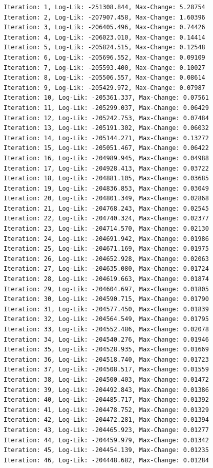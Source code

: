 \documentclass[
  letterpaper,
  DIV=11,
  numbers=noendperiod]{scrreport}
\begin{document}
\begin{verbatim}
Iteration: 1, Log-Lik: -251308.844, Max-Change: 5.28754
Iteration: 2, Log-Lik: -207907.458, Max-Change: 1.60396
Iteration: 3, Log-Lik: -206405.496, Max-Change: 0.74426
Iteration: 4, Log-Lik: -206023.010, Max-Change: 0.14414
Iteration: 5, Log-Lik: -205824.515, Max-Change: 0.12548
Iteration: 6, Log-Lik: -205696.552, Max-Change: 0.09109
Iteration: 7, Log-Lik: -205593.400, Max-Change: 0.10027
Iteration: 8, Log-Lik: -205506.557, Max-Change: 0.08614
Iteration: 9, Log-Lik: -205429.972, Max-Change: 0.07987
Iteration: 10, Log-Lik: -205361.337, Max-Change: 0.07561
Iteration: 11, Log-Lik: -205299.037, Max-Change: 0.06429
Iteration: 12, Log-Lik: -205242.753, Max-Change: 0.07484
Iteration: 13, Log-Lik: -205191.302, Max-Change: 0.06032
Iteration: 14, Log-Lik: -205144.271, Max-Change: 0.13272
Iteration: 15, Log-Lik: -205051.467, Max-Change: 0.06422
Iteration: 16, Log-Lik: -204989.945, Max-Change: 0.04988
Iteration: 17, Log-Lik: -204928.413, Max-Change: 0.03722
Iteration: 18, Log-Lik: -204881.105, Max-Change: 0.03685
Iteration: 19, Log-Lik: -204836.853, Max-Change: 0.03049
Iteration: 20, Log-Lik: -204801.349, Max-Change: 0.02868
Iteration: 21, Log-Lik: -204768.243, Max-Change: 0.02545
Iteration: 22, Log-Lik: -204740.324, Max-Change: 0.02377
Iteration: 23, Log-Lik: -204714.570, Max-Change: 0.02130
Iteration: 24, Log-Lik: -204691.942, Max-Change: 0.01986
Iteration: 25, Log-Lik: -204671.169, Max-Change: 0.01975
Iteration: 26, Log-Lik: -204652.928, Max-Change: 0.02063
Iteration: 27, Log-Lik: -204635.080, Max-Change: 0.01724
Iteration: 28, Log-Lik: -204619.663, Max-Change: 0.01874
Iteration: 29, Log-Lik: -204604.697, Max-Change: 0.01805
Iteration: 30, Log-Lik: -204590.715, Max-Change: 0.01790
Iteration: 31, Log-Lik: -204577.450, Max-Change: 0.01839
Iteration: 32, Log-Lik: -204564.549, Max-Change: 0.01795
Iteration: 33, Log-Lik: -204552.486, Max-Change: 0.02078
Iteration: 34, Log-Lik: -204540.276, Max-Change: 0.01946
Iteration: 35, Log-Lik: -204528.935, Max-Change: 0.01669
Iteration: 36, Log-Lik: -204518.740, Max-Change: 0.01723
Iteration: 37, Log-Lik: -204508.517, Max-Change: 0.01559
Iteration: 38, Log-Lik: -204500.403, Max-Change: 0.01472
Iteration: 39, Log-Lik: -204492.843, Max-Change: 0.01386
Iteration: 40, Log-Lik: -204485.717, Max-Change: 0.01392
Iteration: 41, Log-Lik: -204478.752, Max-Change: 0.01329
Iteration: 42, Log-Lik: -204472.281, Max-Change: 0.01394
Iteration: 43, Log-Lik: -204465.923, Max-Change: 0.01277
Iteration: 44, Log-Lik: -204459.979, Max-Change: 0.01342
Iteration: 45, Log-Lik: -204454.139, Max-Change: 0.01235
Iteration: 46, Log-Lik: -204448.682, Max-Change: 0.01284

\end{verbatim}
\end{document}
